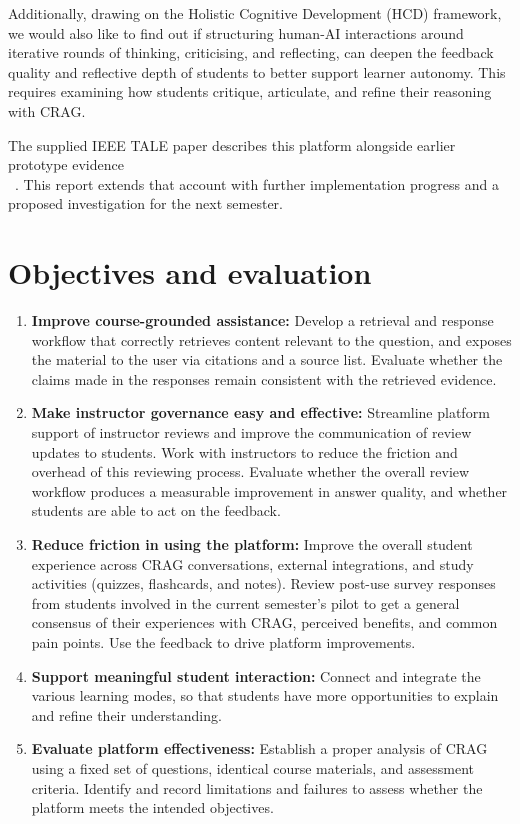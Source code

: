 Additionally, drawing on the Holistic Cognitive Development (HCD) framework, we would also like to find out if structuring human-AI interactions around iterative rounds of thinking, criticising, and reflecting, can deepen the feedback quality and reflective depth of students to better support learner autonomy. This requires examining how students critique, articulate, and refine their reasoning with CRAG.

The supplied IEEE TALE paper describes this platform alongside earlier prototype evidence\\~\parencite{cragpaper}. This report extends that account with further implementation progress and a proposed investigation for the next semester.

\section{Objectives and evaluation}
\begin{enumerate}[label=\textbf{O\arabic*.}]
\item \textbf{Improve course-grounded assistance:} Develop a retrieval and response workflow that correctly retrieves content relevant to the question, and exposes the material to the user via citations and a source list. Evaluate whether the claims made in the responses remain consistent with the retrieved evidence.
\item \textbf{Make instructor governance easy and effective:} Streamline platform support of instructor reviews and improve the communication of review updates to students. Work with instructors to reduce the friction and overhead of this reviewing process. Evaluate whether the overall review workflow produces a measurable improvement in answer quality, and whether students are able to act on the feedback.
\item \textbf{Reduce friction in using the platform:} Improve the overall student experience across CRAG conversations, external integrations, and study activities (quizzes, flashcards, and notes). Review post-use survey responses from students involved in the current semester's pilot to get a general consensus of their experiences with CRAG, perceived benefits, and common pain points. Use the feedback to drive platform improvements.
\item \textbf{Support meaningful student interaction:} Connect and integrate the various learning modes, so that students have more opportunities to explain and refine their understanding. 
\item \textbf{Evaluate platform effectiveness:} Establish a proper analysis of CRAG using a fixed set of questions, identical course materials, and assessment criteria. Identify and record limitations and failures to assess whether the platform meets the intended objectives.
\end{enumerate}


